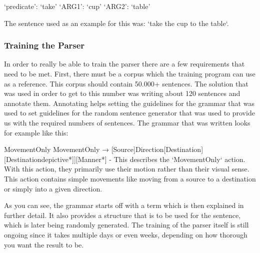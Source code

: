 \documentclass[main.tex]{subfiles}
\begin{document}
{‘predicate’: ‘take’} {‘ARG1’: ‘cup’} {‘ARG2’: ‘table’}

The sentence used as an example for this was: ‘take the cup to the table‘.

\subsubsection{Training the Parser}
In order to really be able to train the parser there are a few requirements that need to be met. First, there must be a corpus which the training program can use as a reference. This corpus should contain 50.000+ sentences. The solution that was used in order to get to this number was writing about 120 sentences and annotate them. Annotating helps setting the guidelines for the grammar that was used to set guidelines for the random sentence generator that was used to provide us with the required numbers of sentences.
The grammar that was written looks for example like this:

MovementOnly
MovementOnly → [Source]Direction[Destination][Destinationdepictive*]][Manner*]
- This describes the ‘MovementOnly‘ action. With this action, they primarily use their motion rather than their visual sense. This action contains simple movements like moving from a source to a destination or simply into a given direction.

As you can see, the grammar starts off with a term which is then explained in further detail. It also provides a structure that is to be used for the sentence, which is later being randomly generated. 
The training of the parser itself is still ongoing since it takes multiple days or even weeks, depending on how thorough you want the result to be. 
\end{document}
